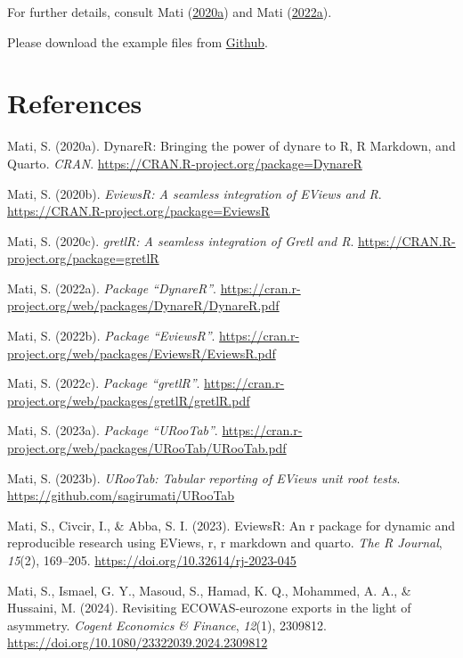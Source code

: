 \documentclass[
  12pt,
  legalpaperpaper,
  DIV=11,
  numbers=noendperiod]{scrartcl}
\newlength{\cslhangindent}
\newlength{\cslentryspacingunit} %
\newenvironment{CSLReferences}[2] %
 {%
  \setlength{\parindent}{0pt}
  \ifodd #1
  \let\oldpar\par
  \def\par{\hangindent=\cslhangindent\oldpar}
  \fi
  \setlength{\parskip}{#2\cslentryspacingunit}
 }%
 {}
\begin{document}
For further details, consult Mati
(\protect\hyperlink{ref-Mati2020}{2020a}) and Mati
(\protect\hyperlink{ref-mati2022dynarer}{2022a}).

Please download the example files from
\href{https://github.com/sagirumati/DynareR/tree/master/inst/examples/}{Github}.

\hypertarget{references}{%
\section*{References}\label{references}}

\hypertarget{refs}{}
\begin{CSLReferences}{1}{0}
\leavevmode{}%
Mati, S. (2020a). DynareR: Bringing the power of dynare to {R, R
Markdown, and Quarto}. \emph{CRAN}.
\url{https://CRAN.R-project.org/package=DynareR}

\leavevmode{}%
Mati, S. (2020b). \emph{EviewsR: A seamless integration of {EViews} and
{R}}. \url{https://CRAN.R-project.org/package=EviewsR}

\leavevmode{}%
Mati, S. (2020c). \emph{gretlR: A seamless integration of {Gretl} and
{R}}. \url{https://CRAN.R-project.org/package=gretlR}

\leavevmode{}%
Mati, S. (2022a). \emph{Package {``DynareR''}}.
\url{https://cran.r-project.org/web/packages/DynareR/DynareR.pdf}

\leavevmode{}%
Mati, S. (2022b). \emph{Package {``EviewsR''}}.
\url{https://cran.r-project.org/web/packages/EviewsR/EviewsR.pdf}

\leavevmode{}%
Mati, S. (2022c). \emph{Package {``gretlR''}}.
\url{https://cran.r-project.org/web/packages/gretlR/gretlR.pdf}

\leavevmode{}%
Mati, S. (2023a). \emph{Package {``URooTab''}}.
\url{https://cran.r-project.org/web/packages/URooTab/URooTab.pdf}

\leavevmode{}%
Mati, S. (2023b). \emph{{URooTab}: Tabular reporting of {EViews} unit
root tests}. \url{https://github.com/sagirumati/URooTab}

\leavevmode{}%
Mati, S., Civcir, I., \& Abba, S. I. (2023). {EviewsR}: An r package for
dynamic and reproducible research using {EViews}, r, r markdown and
quarto. \emph{The R Journal}, \emph{15}(2), 169--205.
\url{https://doi.org/10.32614/rj-2023-045}

\leavevmode{}%
Mati, S., Ismael, G. Y., Masoud, S., Hamad, K. Q., Mohammed, A. A., \&
Hussaini, M. (2024). Revisiting ECOWAS-eurozone exports in the light of
asymmetry. \emph{Cogent Economics \& Finance}, \emph{12}(1), 2309812.
\url{https://doi.org/10.1080/23322039.2024.2309812}

\end{CSLReferences}
\end{document}
